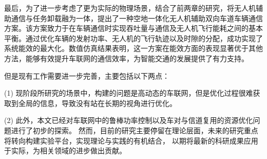 最后，为了进一步考虑了更为实际的物理场景，结合了前两章的研究，将无人机辅助通信与任务卸载融为一体，提出了一种空地一体化无人机辅助双向车道车辆通信方案。该方案致力于在车辆通信时实现吞吐量与通信及无人机飞行能耗之间的基本平衡。通过优化车辆的发射功率、无人机的飞行轨迹以及时隙的分配，成功实现了系统能效的最大化。数值仿真结果表明，这一方案在能效方面的表现显著优于其他方法，能够有效提升车联网的通信效率，为智能交通的发展提供了有力支持。

但是现有工作需要进一步完善，主要包括以下两点：

(1) 现阶段所研究的场景中，构建的问题是高动态的车联网，但是优化过程很难获取到全局的信息，导致没有站在长期的视角进行优化。


(2) 此外，本文已经对车联网中的鲁棒功率控制以及车对与信道复用的资源优化问题进行了初步的探索。
然而，目前的研究主要停留在理论层面，未来的研究重点将转向构建实验平台，实现理论与实践的有机结合，
以期将最新的科研成果应用于实际，为相关领域的进步做出贡献。
